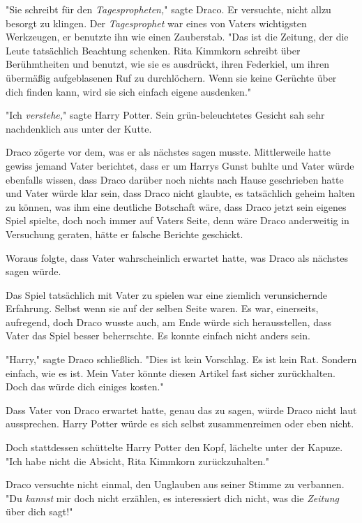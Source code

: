{"Sie schreibt für den \emph{Tagespropheten,}" sagte Draco. Er versuchte, nicht allzu besorgt zu klingen. Der \emph{Tagesprophet} war eines von Vaters wichtigsten Werkzeugen, er benutzte ihn wie einen Zauberstab. "Das ist die Zeitung, der die Leute tatsächlich Beachtung schenken. Rita Kimmkorn schreibt über Berühmtheiten und benutzt, wie sie es ausdrückt, ihren Federkiel, um ihren übermäßig aufgeblasenen Ruf zu durchlöchern. Wenn sie keine Gerüchte über dich finden kann, wird sie sich einfach eigene ausdenken."

"Ich \emph{verstehe,}" sagte Harry Potter. Sein grün-beleuchtetes Gesicht sah sehr nachdenklich aus unter der Kutte.

Draco zögerte vor dem, was er als nächstes sagen musste. Mittlerweile hatte gewiss jemand Vater berichtet, dass er um Harrys Gunst buhlte und Vater würde ebenfalls wissen, dass Draco darüber noch nichts nach Hause geschrieben hatte und Vater würde klar sein, dass Draco nicht glaubte, es tatsächlich geheim halten zu können, was ihm eine deutliche Botschaft wäre, dass Draco jetzt sein eigenes Spiel spielte, doch noch immer auf Vaters Seite, denn wäre Draco anderweitig in Versuchung geraten, hätte er falsche Berichte geschickt.

Woraus folgte, dass Vater wahrscheinlich erwartet hatte, was Draco als nächstes sagen würde.

Das Spiel tatsächlich mit Vater zu spielen war eine ziemlich verunsichernde Erfahrung. Selbst wenn sie auf der selben Seite waren. Es war, einerseits, aufregend, doch Draco wusste auch, am Ende würde sich herausstellen, dass Vater das Spiel besser beherrschte. Es konnte einfach nicht anders sein.

"Harry," sagte Draco schließlich. "Dies ist kein Vorschlag. Es ist kein Rat. Sondern einfach, wie es ist. Mein Vater könnte diesen Artikel fast sicher zurückhalten. Doch das würde dich einiges kosten."

Dass Vater von Draco erwartet hatte, genau das zu sagen, würde Draco nicht laut aussprechen. Harry Potter würde es sich selbst zusammenreimen oder eben nicht.

Doch stattdessen schüttelte Harry Potter den Kopf, lächelte unter der Kapuze. "Ich habe nicht die Absicht, Rita Kimmkorn zurückzuhalten."

Draco versuchte nicht einmal, den Unglauben aus seiner Stimme zu verbannen. "Du \emph{kannst} mir doch nicht erzählen, es interessiert dich nicht, was die \emph{Zeitung} über dich sagt!"

}
